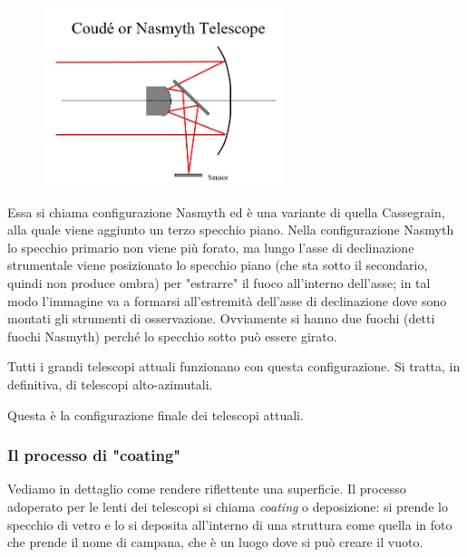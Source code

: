 \begin{figure}[H]
    \centering
    \includegraphics[width=7cm]{14.jpg}
\end{figure}

Essa si chiama configurazione Nasmyth ed è una variante di quella Cassegrain, alla quale viene aggiunto un terzo specchio piano. Nella configurazione Nasmyth lo specchio primario non viene più forato, ma lungo l'asse di declinazione strumentale viene posizionato lo specchio piano (che sta sotto il secondario, quindi non produce ombra) per "estrarre" il fuoco all'interno dell'asse; in tal modo l'immagine va a formarsi all'estremità dell'asse di declinazione dove sono montati gli strumenti di osservazione. Ovviamente si hanno due fuochi (detti fuochi Nasmyth) perché lo specchio sotto può essere girato.

Tutti i grandi telescopi attuali funzionano con questa configurazione. Si tratta, in definitiva, di telescopi alto-azimutali.

Questa è la configurazione finale dei telescopi attuali.

\subsubsection{Il processo di "coating"}
Vediamo in dettaglio come rendere riflettente una superficie. Il processo adoperato per le lenti dei telescopi si chiama \textit{coating} o deposizione: si prende lo specchio di vetro e lo si deposita all'interno di una struttura come quella in foto che prende il nome di campana, che è un luogo dove si può creare il vuoto.

